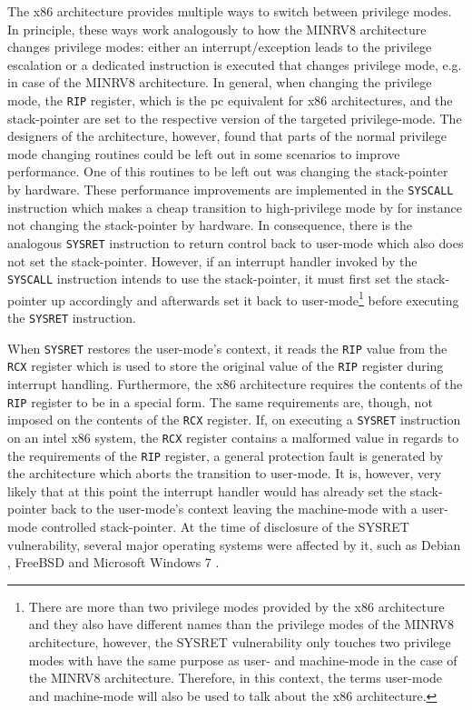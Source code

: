 The x86 architecture provides multiple ways to switch between privilege modes.
In principle, these ways work analogously to how the MINRV8 architecture changes privilege modes: either an interrupt/exception leads to the privilege escalation or a dedicated instruction is executed that changes privilege mode, e.g.  in case of the MINRV8 architecture.
In general, when changing the privilege mode, the \lstinline{RIP} register, which is the \gls{pc} equivalent for x86 architectures, and the stack-pointer are set to the respective version of the targeted privilege-mode.
The designers of the architecture, however, found that parts of the normal privilege mode changing routines could be left out in some scenarios to improve performance.
One of this routines to be left out was changing the stack-pointer by hardware.
These performance improvements are implemented in the \lstinline{SYSCALL} instruction which makes a cheap transition to high-privilege mode by for instance not changing the stack-pointer by hardware.
In consequence, there is the analogous \lstinline{SYSRET} instruction to return control back to user-mode which also does not set the stack-pointer.
However, if an interrupt handler invoked by the \lstinline{SYSCALL} instruction intends to use the stack-pointer, it must first set the stack-pointer up accordingly and afterwards set it back to user-mode\footnote{%
    There are more than two privilege modes provided by the x86 architecture and they also have different names than the privilege modes of the MINRV8 architecture, however, the SYSRET vulnerability only touches two privilege modes with have the same purpose as user- and machine-mode in the case of the MINRV8 architecture.
    Therefore, in this context, the terms user-mode and machine-mode will also be used to talk about the x86 architecture.
} before executing the \lstinline{SYSRET} instruction.

When \lstinline{SYSRET} restores the user-mode's context, it reads the \lstinline{RIP} value from the \lstinline{RCX} register which is used to store the original value of the \lstinline{RIP} register during interrupt handling.
Furthermore, the x86 architecture requires the contents of the \lstinline{RIP} register to be in a special form.
The same requirements are, though, not imposed on the contents of the \lstinline{RCX} register.
If, on executing a \lstinline{SYSRET} instruction on an intel x86 system, the \lstinline{RCX} register contains a malformed value in regards to the requirements of the \lstinline{RIP} register, a general protection fault is generated by the architecture which aborts the transition to user-mode.
It is, however, very likely that at this point the interrupt handler would has already set the stack-pointer back to the user-mode's context leaving the machine-mode with a user-mode controlled stack-pointer.
At the time of disclosure of the SYSRET vulnerability, several major operating systems were affected by it, such as Debian \cite{SYSRETDebian}, FreeBSD \cite{SYSRETFreeBSD} and Microsoft Windows 7 \cite{SYSRETMicrosoft}.

